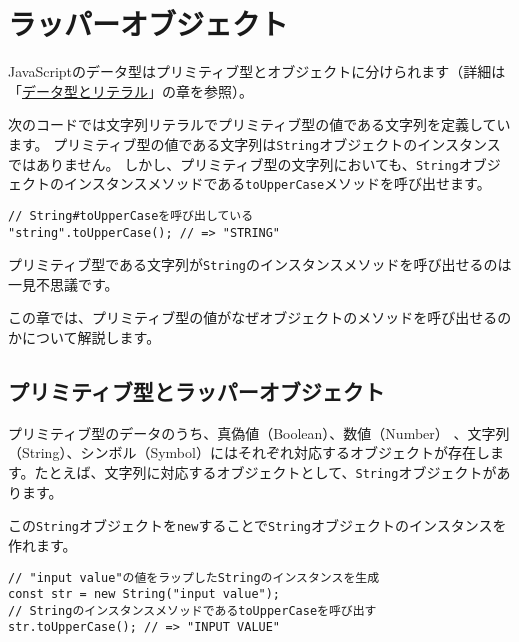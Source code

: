 \hypertarget{wrapper-object}{%
\chapter{ラッパーオブジェクト}\label{wrapper-object}}
\thispagestyle{frontheadings}

JavaScriptのデータ型はプリミティブ型とオブジェクトに分けられます（詳細は「\hyperlink{data-type-and-literal}{データ型とリテラル}」の章を参照）。

次のコードでは文字列リテラルでプリミティブ型の値である文字列を定義しています。
プリミティブ型の値である文字列は\texttt{String}オブジェクトのインスタンスではありません。
しかし、プリミティブ型の文字列においても、\texttt{String}オブジェクトのインスタンスメソッドである\texttt{toUpperCase}メソッドを呼び出せます。

\begin{lstlisting}
// String#toUpperCaseを呼び出している
"string".toUpperCase(); // => "STRING"
\end{lstlisting}

プリミティブ型である文字列が\texttt{String}のインスタンスメソッドを呼び出せるのは一見不思議です。

この章では、プリミティブ型の値がなぜオブジェクトのメソッドを呼び出せるのかについて解説します。

\hypertarget{primitive-type-and-wrapper-object}{%
\section{プリミティブ型とラッパーオブジェクト}\label{primitive-type-and-wrapper-object}}

プリミティブ型のデータのうち、真偽値（Boolean）、数値（Number）
、文字列（String）、シンボル（Symbol）にはそれぞれ対応するオブジェクトが存在します。たとえば、文字列に対応するオブジェクトとして、\texttt{String}オブジェクトがあります。

この\texttt{String}オブジェクトを\texttt{new}することで\texttt{String}オブジェクトのインスタンスを作れます。

\begin{lstlisting}
// "input value"の値をラップしたStringのインスタンスを生成
const str = new String("input value");
// StringのインスタンスメソッドであるtoUpperCaseを呼び出す
str.toUpperCase(); // => "INPUT VALUE"
\end{lstlisting}

